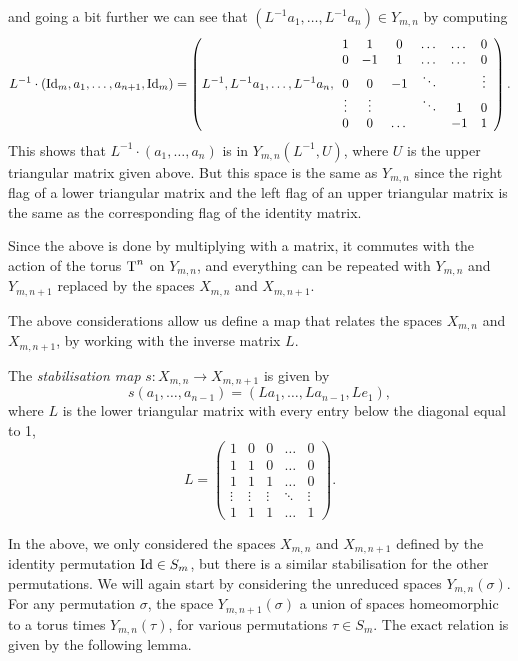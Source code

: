 and going a bit further we can see that
$(L^{-1}a_1,\dots,L^{-1}a_{n}) \in Y_{m,n}$ by computing
\[ L^{-1}\cdot \left(\operatorname{Id}_m,a_1,\dots,a_{n+1},\operatorname{Id}_m\right) =
\left(L^{-1},L^{-1}a_1,\dots,L^{-1}a_{n},
  \begin{array}{cccccc}
    1 & 1 & 0 & \dots & \dots & 0 \\
    0 & -1 & 1 & \dots & \dots& 0\\
    0 & 0 & -1 & \ddots & & \vdots\\
    \vdots & \vdots & & \ddots & 1 & 0 \\
    0 & 0 & \dots & & -1& 1
  \end{array}
\right). \] 
This shows that $L^{-1}\cdot(a_1,\dots,a_{n})$ is in
$Y_{m,n}(L^{-1},U)$, where $U$ is the
upper triangular matrix given above. But this space is the same as
$Y_{m,n}$ since the right flag of a lower triangular matrix and the
left flag of an upper triangular matrix
is the same as the corresponding flag of the identity
matrix. 

Since the above is done by multiplying with a matrix, it commutes with
the action of the torus $\operatorname{T}^n$ on $Y_{m,n}$, and everything can be
repeated with $Y_{m,n}$ and $Y_{m,n+1}$ replaced by the spaces
$X_{m,n}$ and $X_{m,n+1}$.

The above considerations allow us define a map that relates the spaces
$X_{m,n}$ and $X_{m,n+1}$, by working with the inverse matrix $L$.
\begin{definition}
  \label{def:stabilisering}
  The \textit{stabilisation map} $s : X_{m,n} \to X_{m,n+1}$ is given
  by
  \[ s\left(a_1,\dots,a_{n-1}\right) =
  \left(La_1,\dots,La_{n-1},Le_1\right), \]
  where $L$ is the lower triangular matrix with every entry below the
  diagonal equal to 1,
  \[ L =
  \begin{pmatrix}
    1 & 0 & 0 & \dots & 0 \\
    1 & 1 & 0 & \dots & 0 \\
    1 & 1 & 1 & \dots & 0 \\
    \vdots & \vdots & \vdots & \ddots & \vdots \\
    1 & 1 & 1 & \dots & 1
  \end{pmatrix}. \]
\end{definition}

In the above, we only considered the spaces $X_{m,n}$ and $X_{m,n+1}$
defined by the identity permutation $\operatorname{Id}\in S_m$,
but there is a similar stabilisation for the other permutations. We
will again start by considering the unreduced spaces
$Y_{m,n}(\sigma)$. For
any permutation $\sigma$, the space $Y_{m,n+1}(\sigma)$ a union of
spaces homeomorphic to a torus times $Y_{m,n}(\tau)$, for various
permutations $\tau\in S_m$. The exact relation is given by the
following lemma.

